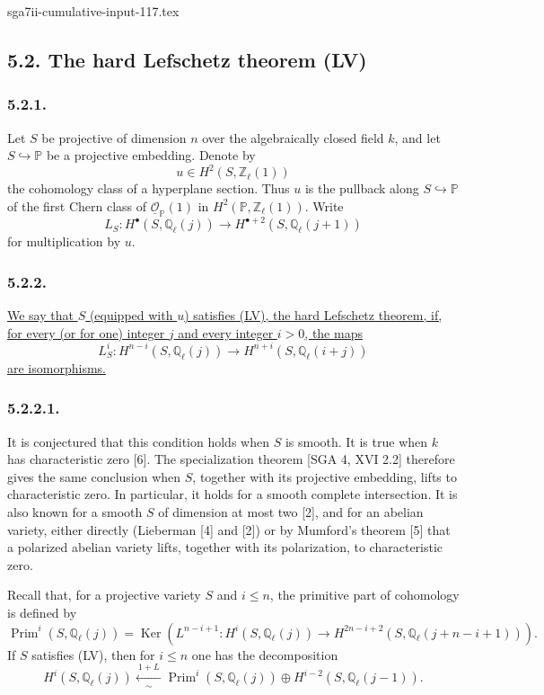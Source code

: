 \begin{filecontents*}{sga7ii-cumulative-input-117.tex}
\subsection*{5.2. The hard Lefschetz theorem (LV)}

\subsubsection*{5.2.1.}
Let $S$ be projective of dimension $n$ over the algebraically closed field
$k$, and let $S\hookrightarrow\mathbb P$ be a projective embedding.  Denote by
\[
u\in H^2(S,\mathbb Z_\ell(1))
\]
the cohomology class of a hyperplane section.  Thus $u$ is the pullback along
$S\hookrightarrow\mathbb P$ of the first Chern class of
$\underline{\mathcal O}_{\mathbb P}(1)$ in
$H^2(\mathbb P,\mathbb Z_\ell(1))$.  Write
\[
L_S:H^\bullet(S,\mathbb Q_\ell(j))
   \longrightarrow H^{\bullet+2}(S,\mathbb Q_\ell(j+1))
\]
for multiplication by $u$.

\subsubsection*{5.2.2.}
\underline{We say that $S$ (equipped with $u$) satisfies (LV), the hard
Lefschetz theorem, if, for every (or for one) integer $j$ and every integer
$i>0$, the maps}
\[
L_S^i:H^{n-i}(S,\mathbb Q_\ell(j))
\longrightarrow H^{n+i}(S,\mathbb Q_\ell(i+j))
\]
\underline{are isomorphisms.}

\subsubsection*{5.2.2.1.}
It is conjectured that this condition holds when $S$ is smooth.  It is true
when $k$ has characteristic zero [6].  The specialization theorem
[SGA 4, XVI 2.2] therefore gives the same conclusion when $S$, together with
its projective embedding, lifts to characteristic zero.  In particular, it
holds for a smooth complete intersection.  It is also known for a smooth $S$
of dimension at most two [2], and for an abelian variety, either directly
(Lieberman [4] and [2]) or by Mumford's theorem [5] that a polarized abelian
variety lifts, together with its polarization, to characteristic zero.

Recall that, for a projective variety $S$ and $i\leq n$, the primitive part of
cohomology is defined by
\begin{equation}\tag{5.2.2.2}
\operatorname{Prim}^i(S,\mathbb Q_\ell(j))
=\operatorname{Ker}\!\left(
L^{n-i+1}:H^i(S,\mathbb Q_\ell(j))
\longrightarrow
H^{2n-i+2}(S,\mathbb Q_\ell(j+n-i+1))
\right).
\end{equation}
If $S$ satisfies (LV), then for $i\leq n$ one has the decomposition
\begin{equation}\tag{5.2.2.3}
H^i(S,\mathbb Q_\ell(j))
\xleftarrow[\sim]{\ 1+L\ }
\operatorname{Prim}^i(S,\mathbb Q_\ell(j))
\oplus H^{i-2}(S,\mathbb Q_\ell(j-1)).
\end{equation}


\end{filecontents*}
